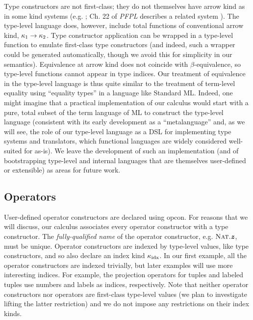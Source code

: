 Type constructors are not first-class; they do not themselves have arrow kind as in some kind systems (e.g.  \cite{Watkins08}; Ch. 22 of \emph{PFPL} describes a related system \cite{pfpl}). The type-level language does, however, include total functions of conventional arrow kind, $\kappa_1\rightarrow{\kappa_2}$. Type constructor application can be wrapped in a type-level function to emulate first-class type constructors (and indeed, such a wrapper could be generated automatically, though we avoid this for simplicity in our semantics). Equivalence at arrow kind does not coincide with $\beta$-equivalence, so type-level functions cannot appear in type indices. Our treatment of equivalence in the type-level language is thus quite similar to the treatment of term-level equality using ``equality types'' in a language like Standard ML. Indeed, one might imagine that a practical implementation of our calculus would start with a pure, total subset of the term language of ML to construct the type-level language (consistent with its early development as a ``metalanguage'' and, as we will see, the role of our type-level language as a DSL for implementing type systems and translators, which functional languages are widely considered well-suited for as-is). We leave the development of such an implementation (and of bootstrapping type-level and internal languages that are themselves user-defined or extensible) as areas for future work.
\subsection{Operators}
User-defined operator constructors are declared using \textsf{opcon}. For reasons that we will discuss, our calculus associates every operator constructor with a type constructor. The \emph{fully-qualified name} of the operator constructor, e.g. $\textsc{Nat}.\textbf{\textit{z}}$, must be unique. Operator constructors are indexed by type-level values, like type constructors, and so also declare an index kind $\kappa_{\text{idx}}$. In our first example, all the operator constructors are indexed trivially, but later examples will use more interesting indices. For example, the projection operators for tuples and labeled tuples use numbers and labels as indices, respectively.
Note that neither operator constructors nor operators are first-class type-level values (we plan to investigate  lifting the latter restriction) and we do not impose any restrictions on their index kinds.

